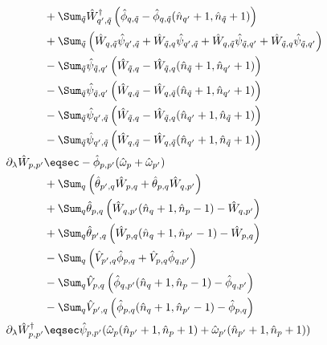 \begin{appendix}
\begin{subequations}
\begin{align}
&+\Sum_{\tilde q}\hat W_{q^\prime,\tilde q}^\dagger \left(\hat\phi_{q, \tilde q}-\hat\phi_{q, \tilde q}(\hat n_{q^\prime}+1,\hat n_{\tilde q}+1)\right) \nonumber\\
&+\Sum_{\tilde q} \left(\hat W_{q,\tilde q}\hat \psi_{q^\prime,\tilde q}+\hat W_{\tilde q,q}\hat \psi_{q^\prime,\tilde q}+\hat W_{q,\tilde q}\hat \psi_{\tilde q,q^\prime}  + \hat W_{\tilde q,q}\hat \psi_{\tilde q,q^\prime}\right) \nonumber\\
&- \Sum_{\tilde q}\hat \psi_{\tilde q,q^\prime} \left(\hat W_{ \tilde q,q}-\hat W_{ \tilde q,q}(\hat n_{\tilde q}+1,\hat n_{q^\prime}+1)\right)\nonumber\\
&-\Sum_{\tilde q}\hat \psi_{\tilde q,q^\prime} \left(\hat W_{q,\tilde q}-\hat W_{q,\tilde q}(\hat n_{\tilde q}+1,\hat n_{q^\prime}+1)\right) \nonumber\\
&-\Sum_{\tilde q}\hat \psi_{q^\prime,\tilde q} \left(\hat W_{\tilde q,q}-\hat W_{\tilde q,q}(\hat n_{q^\prime}+1,\hat n_{\tilde q}+1)\right) \nonumber\\
&-\Sum_{\tilde q}\hat \psi_{q^\prime,\tilde q} \left(\hat W_{q, \tilde q}-\hat W_{q, \tilde q}(\hat n_{q^\prime}+1,\hat n_{\tilde q}+1)\right) \nonumber\\
\partial_\lambda\hat W_{p,p^\prime}&\eqsec -\hat\phi_{p,p^\prime}(\hat\omega_p+\hat\omega_{p^\prime})\\
&+\Sum_{q}\left(\hat\theta_{ p^\prime, q}\hat W_{p,q}+\hat\theta_{ p,q}\hat W_{q,p^\prime}\right) \nonumber\\
&+  \Sum_{ q} \hat\theta_{ p,q}\left(\hat W_{q,p^\prime}(\hat n_{q}+1,\hat n_p-1)- \hat W_{q,p^\prime}\right)                         \nonumber\\
&+        \Sum_{ q} \hat\theta_{ p^\prime,q}\left(\hat W_{p,q}(\hat n_{q}+1,\hat n_{p^\prime}-1)- \hat W_{p,q}\right)                   \nonumber\\
&-       \Sum_{q}\left(\hat V_{ p^\prime, q}\hat \phi_{p,q}+\hat V_{ p,q}\hat \phi_{q,p^\prime}\right)                    \nonumber\\
&-         \Sum_{ q} \hat V_{ p,q}\left(\hat \phi_{q,p^\prime}(\hat n_{q}+1,\hat n_p-1)- \hat \phi_{q,p^\prime}\right)                  \nonumber\\
&-          \Sum_{ q} \hat V_{ p^\prime,q}\left(\hat \phi_{p,q}(\hat n_{q}+1,\hat n_{p^\prime}-1)- \hat \phi_{p,q}\right)                 \nonumber\\
\partial_\lambda\hat W_{p,p^\prime}^\dagger&\eqsec \hat\psi_{p,p^\prime} (\hat\omega_p(\hat n_{p^\prime}+1,\hat n_p +1)+\hat\omega_{p^\prime}(\hat n_{p^\prime}+1,\hat n_p +1))\\

\end{align}
\end{subequations}
\end{appendix}
